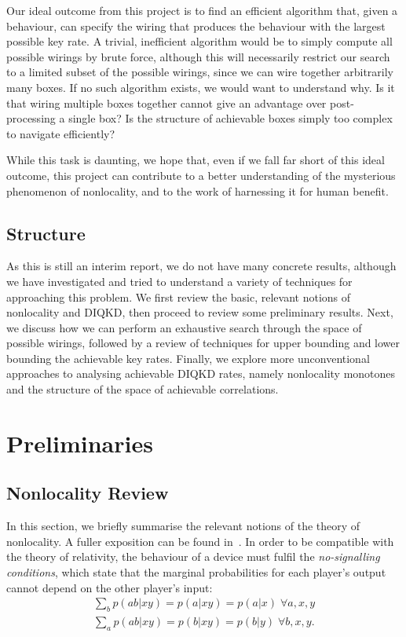 \documentclass[10pt, a4paper]{article}
\newcommand{\?}{\mathrel{?}} %
\numberwithin{equation}{section} %
\theoremstyle{definition}
\theoremstyle{plain}
\theoremstyle{plain}
\begin{document}
  Our ideal outcome from this project is to find an efficient algorithm that, given a behaviour, can specify the wiring that produces the behaviour with the largest possible key rate. A trivial, inefficient algorithm would be to simply compute all possible wirings by brute force, although this will necessarily restrict our search to a limited subset of the possible wirings, since we can wire together arbitrarily many boxes. If no such algorithm exists, we would want to understand why. Is it that wiring multiple boxes together cannot give an advantage over post-processing a single box? Is the structure of achievable boxes simply too complex to navigate efficiently?

  While this task is daunting, we hope that, even if we fall far short of this ideal outcome, this project can contribute to a better understanding of the mysterious phenomenon of nonlocality, and to the work of harnessing it for human benefit.

  \subsection{Structure}

  As this is still an interim report, we do not have many concrete results, although we have investigated and tried to understand a variety of techniques for approaching this problem. We first review the basic, relevant notions of nonlocality and DIQKD, then proceed to review some preliminary results. Next, we discuss how we can perform an exhaustive search through the space of possible wirings, followed by a review of techniques for upper bounding and lower bounding the achievable key rates. Finally, we explore more unconventional approaches to analysing achievable DIQKD rates, namely nonlocality monotones and the structure of the space of achievable correlations.

  \section{Preliminaries}

  \subsection{Nonlocality Review}

  In this section, we briefly summarise the relevant notions of the theory of nonlocality. A fuller exposition can be found in~\cite{BellNonlocality}. In order to be compatible with the theory of relativity, the behaviour of a device must fulfil the \emph{no-signalling conditions}, which state that the marginal probabilities for each player's output cannot depend on the other player's input:
  \begin{gather}
    \sum_b p(ab|xy) = p(a|xy) = p(a|x)\;\forall a,x,y \\
    \sum_a p(ab|xy) = p(b|xy) = p(b|y)\;\forall b,x,y.
  \end{gather}
\end{document}
